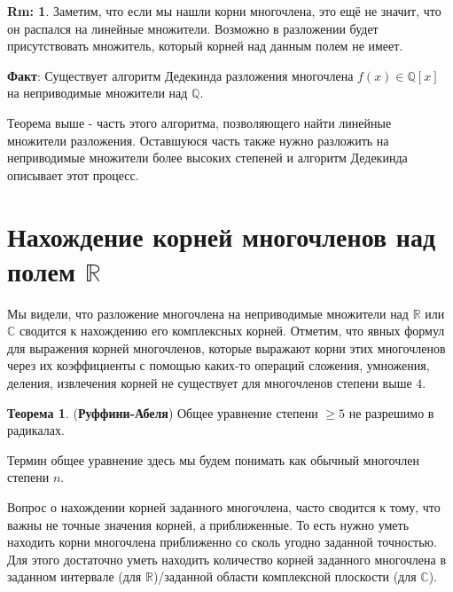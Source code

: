 \documentclass[12pt]{article}
\newcommand{\MR}{\mathbb{R}}
\newcommand{\MC}{\mathbb{C}}
\newcommand{\MQ}{\mathbb{Q}}
\theoremstyle{definition}
\newtheorem{rem}{Rm:}
\newtheorem{theorem}{Теорема}
\begin{document}
\begin{rem}
	Заметим, что если мы нашли корни многочлена, это ещё не значит, что он распался на линейные множители. Возможно в разложении будет присутствовать множитель, который корней над данным полем не имеет.
\end{rem}

\textbf{Факт}: Существует алгоритм Дедекинда разложения многочлена $f(x) \in \MQ[x]$ на неприводимые множители над $\MQ$. 

Теорема выше - часть этого алгоритма, позволяющего найти линейные множители разложения. Оставшуюся часть также нужно разложить на неприводимые множители более высоких степеней и алгоритм Дедекинда описывает этот процесс.

\newpage
\section*{Нахождение корней многочленов над полем $\MR$}
Мы видели, что разложение многочлена на неприводимые множители над $\MR$ или $\MC$ сводится к нахождению его комплексных корней. Отметим, что явных формул для выражения корней многочленов, которые выражают корни этих многочленов через их коэффициенты с помощью каких-то операций сложения, умножения, деления, извлечения корней не существует для многочленов степени выше $4$.
\begin{theorem}(\textbf{Руффини-Абеля})
	Общее уравнение степени $\geq 5$ не разрешимо в радикалах.
\end{theorem}
Термин общее уравнение здесь мы будем понимать как обычный многочлен степени $n$.

Вопрос о нахождении корней заданного многочлена, часто сводится к тому, что важны не точные значения корней, а приближенные. То есть нужно уметь находить корни многочлена приближенно со сколь угодно заданной точностью. Для этого достаточно уметь находить количество корней заданного многочлена в заданном интервале (для $\MR$)/заданной области комплексной плоскости (для $\MC$).
\end{document}
